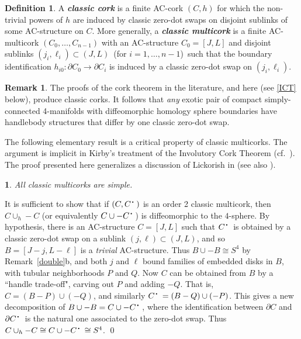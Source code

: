 \documentclass[11pt]{amsart}
\newcommand{\thistheoremname}{}
\newtheorem{genericthm}[theorem]{\thistheoremname}
\newenvironment{namedtheorem}[1]
  {\renewcommand{\thistheoremname}{#1}%
   \begin{genericthm}}
  {\end{genericthm}}
\theoremstyle{definition}
\newtheorem{definition}[theorem]{Definition}
\newtheorem*{remark*}{Remark}
\newcommand{\remref}[1]{Remark~\ref{#1}}
\newcommand{\bit}[1]{\textbf{\textit{#1}}} %
\newcommand{\del}{\partial}
\newcommand{\dt}{{\hskip-.2pt\raisebox{.2ex}{\text{\tiny\textbullet}}\,}}
\newcommand{\ac}{\textup{AC}}
\begin{document}
\begin{definition}\label{classic}
A \bit{classic cork} is a finite \ac-cork $(C,h)$ for which the non-trivial powers of $h$ are induced by classic zero-dot swaps on disjoint sublinks of some \ac-structure on $C$.  More generally, a \bit{classic multicork} is a finite \ac-multicork $(C_0,\dots,C_{n-1})$ with an \ac-structure $C_0 = [J,L]$ and disjoint sublinks $(j_i, \ell_i) \subset (J,L)$ \,(for $i=1,\dots,n-1$)\, such that the boundary identification $h_{i0}\colon\del C_0\to \del C_i$ is induced by a classic zero-dot swap on $(j_i,\ell_i)$.  
\end{definition} 


\begin{remark*} 
\noindent The proofs of the cork theorem in the literature, and here (see \ref{ICT} below), produce classic corks. It follows that {\sl any} exotic pair of compact simply-connected 4-manifolds with diffeomorphic homology sphere boundaries have handlebody structures that differ by one classic zero-dot swap.
\end{remark*}

The following elementary result is a critical property of classic multicorks.  The argument is implicit in Kirby's treatment of the Involutory Cork Theorem \cite{kirby:cork} (cf.\ \cite[Fact; pp.\,576--581]{matveyev}).  The proof presented here generalizes a discussion of Lickorish in \cite{lickorish} (see also \cite{akbulut:SAC}). 

\begin{namedtheorem}{Classic Multicork Lemma} \label{AClemma}
All classic multicorks are simple. 
\end{namedtheorem}

\proof
It is sufficient to show that if $(C, C^\dt)$ is an order 2 classic multicork, then $C\cup_h-C$ (or equivalently $C\cup -C^\dt$) is diffeomorphic to the $4$-sphere. By hypothesis, there is an \ac-structure $C =[J,L]$ such that $C^\dt$ is obtained by a classic zero-dot swap on a sublink $(j, \ell)\subset (J,L)$, and so $B = [J-j,L-\ell]$ is a {\sl trivial} \ac-structure.  Thus $B \cup -B \cong S^4$ by \remref{double}b, and both $j$ and $\ell$ bound families of embedded disks in $B$, with tubular neighborhoods $P$ and $Q$.  Now $C$ can be obtained from $B$ by a ``handle trade-off", carving out $P$ and adding $-Q$.  That is, $C = (B-P)\cup(-Q)$, and similarly $C^\dt = (B-Q)\cup(-P)$.  This gives a new decomposition of $B\cup -B = C\cup - C^\dt$, where the identification between $\del C$ and $\del C^\dt$ is the natural one associated to the zero-dot swap.  Thus $C\cup_h -C  \cong C\cup -C^\dt  \cong S^4$. 
\qed 
\end{document}
